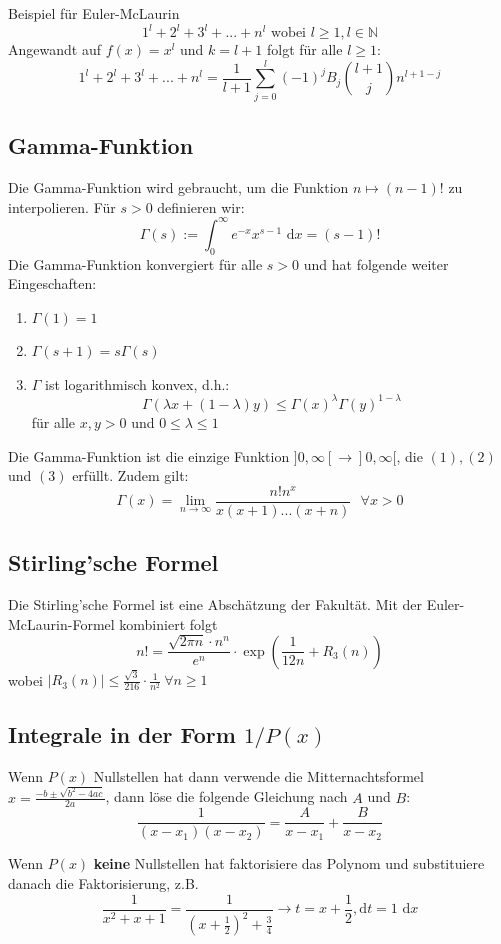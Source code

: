 \documentclass[a4paper,10pt]{article}
\def\limn{\lim_{n\to \infty}}
\def\dx{\text{ d}x}
\begin{document}
\begin{subbox}{Beispiel für Euler-McLaurin}
	$$1^l + 2^l + 3^l + ... + n^l \text{ wobei } l \geq 1, l \in \mathbb{N}$$
	Angewandt auf $f(x) = x^l$ und $k = l + 1$ folgt für alle $l \geq 1$:
	$$1^l + 2^l + 3^l + ... + n^l = \frac{1}{l + 1} \sum_{j = 0}^l (-1)^j B_j {l + 1 \choose j} n^{l+1-j}$$
\end{subbox}

\subsection{Gamma-Funktion}
Die Gamma-Funktion wird gebraucht, um die Funktion $n \mapsto (n-1)!$ zu interpolieren. Für $s > 0$ definieren wir: $$\Gamma(s) := \int_0^\infty e^{-x}x^{s-1}\dx = (s-1)!$$
Die Gamma-Funktion konvergiert für alle $s > 0$ und hat folgende weiter Eingeschaften:
\begin{enumerate}
	\item $\Gamma(1) = 1$
	\item $\Gamma(s + 1) = s \Gamma(s)$
	\item $\Gamma$ ist logarithmisch konvex, d.h.: $$\Gamma(\lambda x + (1 - \lambda)y) \leq \Gamma(x)^\lambda \Gamma(y)^{1 - \lambda}$$ für alle $x, y > 0$ und $0 \leq \lambda \leq 1$
\end{enumerate}
Die Gamma-Funktion ist die einzige Funktion $]0, \infty[ \to ]0, \infty[$, die $(1), (2)$ und $(3)$ erfüllt. Zudem gilt: $$\Gamma(x) = \limn \frac{n!n^x}{x(x+1)...(x+n)} \ \ \ \forall x > 0$$

\subsection{Stirling'sche Formel}
Die Stirling'sche Formel ist eine Abschätzung der Fakultät. Mit der Euler-McLaurin-Formel kombiniert folgt
$$n! = \frac{\sqrt{2\pi n} \cdot n^n}{e^n} \cdot \exp\left(\frac{1}{12n}+R_3(n)\right)$$
wobei $|R_3(n)| \le \frac{\sqrt{3}}{216}\cdot\frac{1}{n^2} \ \forall n \ge 1$
\subsection{Integrale in der Form $1/P(x)$}

Wenn $P(x)$ Nullstellen hat dann verwende die Mitternachtsformel $x = \frac{-b \pm \sqrt{b^2 - 4ac}}{2a}$, dann löse die folgende Gleichung nach $A$ und $B$:
$$
\frac{1}{(x-x_1)(x-x_2)}=\frac{A}{x-x_1}+\frac{B}{x-x_2}
$$

\noindent Wenn $P(x)$ \textbf{keine} Nullstellen hat faktorisiere das Polynom und substituiere danach die Faktorisierung, z.B.
$$
\frac{1}{x^2+x+1}=\frac{1}{\left(x+\frac{1}{2}\right)^2+\frac{3}{4}} \rightarrow t=x+\frac{1}{2}, \text{d}t = 1 \dx
$$
\end{document}
